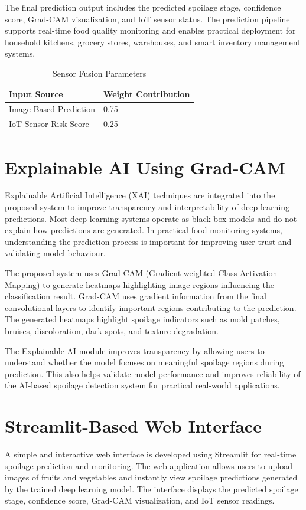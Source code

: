 The final prediction output includes the predicted spoilage stage, confidence score, Grad-CAM visualization, and IoT sensor status. The prediction pipeline supports real-time food quality monitoring and enables practical deployment for household kitchens, grocery stores, warehouses, and smart inventory management systems.

\begin{table}[H]
	\centering
	\caption{Sensor Fusion Parameters}
	\label{tab:fusion_params}
	\begin{tabular}{|l|l|}
		\hline
		\textbf{Input Source} & \textbf{Weight Contribution} \\ \hline
		Image-Based Prediction & 0.75 \\ \hline
		IoT Sensor Risk Score & 0.25 \\ \hline
	\end{tabular}
\end{table}

\section[Explainable AI Using Grad-CAM]{\textbf{Explainable AI Using Grad-CAM}}
Explainable Artificial Intelligence (XAI) techniques are integrated into the proposed system to improve transparency and interpretability of deep learning predictions. Most deep learning systems operate as black-box models and do not explain how predictions are generated. In practical food monitoring systems, understanding the prediction process is important for improving user trust and validating model behaviour.

The proposed system uses Grad-CAM (Gradient-weighted Class Activation Mapping) to generate heatmaps highlighting image regions influencing the classification result. Grad-CAM uses gradient information from the final convolutional layers to identify important regions contributing to the prediction. The generated heatmaps highlight spoilage indicators such as mold patches, bruises, discoloration, dark spots, and texture degradation.

The Explainable AI module improves transparency by allowing users to understand whether the model focuses on meaningful spoilage regions during prediction. This also helps validate model performance and improves reliability of the AI-based spoilage detection system for practical real-world applications.

\section[Streamlit-Based Web Interface]{\textbf{Streamlit-Based Web Interface}}
A simple and interactive web interface is developed using Streamlit for real-time spoilage prediction and monitoring. The web application allows users to upload images of fruits and vegetables and instantly view spoilage predictions generated by the trained deep learning model. The interface displays the predicted spoilage stage, confidence score, Grad-CAM visualization, and IoT sensor readings.

